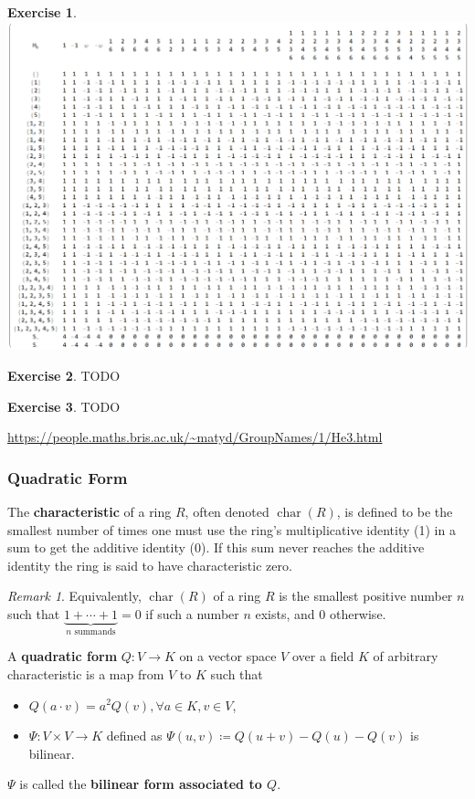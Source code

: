 \documentclass[12pt, letterpaper]{article}
\newcommand{\red}[1]{{\color{red} #1}}
\newcommand{\define}{\coloneqq}
\theoremstyle{definition}
\theoremstyle{remark}
\newtheorem*{rem*}{Remark}
\theoremstyle{definition}
\newtheorem{exe}{Exercise}[section]
\theoremstyle{plain}
\numberwithin{equation}{section}
\begin{document}
\begin{exe}
		\includegraphics[scale=0.4]{CharacterTable_H6}
	\end{exe}

	\begin{exe}
		\red{TODO}
	\end{exe}
	\begin{exe}
		\red{TODO}
		
		\url{https://people.maths.bris.ac.uk/~matyd/GroupNames/1/He3.html}
	\end{exe}

	\subsubsection{Quadratic Form}
	\begin{def*}[characteristic]
		The \textbf{characteristic} of a ring $R$, often denoted $\operatorname{char}(R)$, is defined to be the smallest number of times one must use the ring's multiplicative identity (1) in a sum to get the additive identity (0). If this sum never reaches the additive identity the ring is said to have characteristic zero.
	\end{def*}
	\begin{rem*}
		Equivalently, $\operatorname{char}(R)$ of a ring $R$ is the smallest positive number $n$ such that
		$\underbrace{1+\cdots+1}_{n \text{ summands}} = 0$
		if such a number $n$ exists, and 0 otherwise.
	\end{rem*}
	\begin{def*}
		A \textbf{quadratic form}
		$Q\colon V\to K$
		on a vector space $V$ over a field $K$ of arbitrary characteristic is a map from $V$ to $K$ such that
		\begin{itemize}
			\item $Q(a\cdot v) = a^2Q(v), \forall a \in K, v \in V$,
			\item $\Psi\colon V\times V\to K$ defined as $\Psi(u,v)\define Q(u+v)-Q(u)-Q(v)$
			is bilinear.
		\end{itemize}
		$\Psi$ is called the \textbf{bilinear form associated to $Q$}.
	\end{def*}
\end{document}
